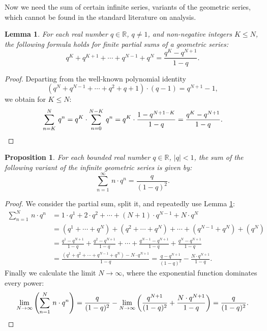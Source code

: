 \documentclass{amsart}
\newtheorem{lemma}{Lemma}[section]
\newtheorem{proposition}{Proposition}[section]
\theoremstyle{definition}
\theoremstyle{remark}
\begin{document}
\noindent
Now we need the sum of certain infinite series,
variants of the geometric series,
which cannot be found in the standard literature on analysis.
\begin{lemma}
\label{lem:FinitePart}
For each real number \(q\in\mathbb{R}\), \(q\ne 1\),
and non-negative integers \(K\le N\), the following formula holds
for finite partial sums of a geometric series:
\begin{equation}
\label{eqn:FinitePart}
q^K+q^{K+1}+\cdots+q^{N-1}+q^N=\frac{q^K-q^{N+1}}{1-q}.
\end{equation}
\end{lemma}
\begin{proof}
Departing from the well-known polynomial identity
\[\left(q^N+q^{N-1}+\cdots+q^2+q+1\right)\cdot(q-1)=q^{N+1}-1,\]
we obtain for \(K\le N\):
\[\sum_{n=K}^N\,q^n
=q^K\cdot\sum_{n=0}^{N-K}\,q^n
=q^K\cdot\frac{1-q^{N+1-K}}{1-q}
=\frac{q^K-q^{N+1}}{1-q}. \qedhere\]
\end{proof}
\begin{proposition}
\label{prp:GeometricVariant}
For each bounded real number \(q\in\mathbb{R}\), \(\lvert q\rvert<1\),
the sum of the following variant of the infinite geometric series is given by:
\begin{equation}
\label{eqn:GeometricVariant}
\sum_{n=1}^\infty\,n\cdot q^n=\frac{q}{(1-q)^2}.
\end{equation}
\end{proposition}
\begin{proof}
We consider the partial sum, split it, and repeatedly use Lemma
\ref{lem:FinitePart}:
\begin{equation*}
\label{eqn:Splitting}
\begin{aligned}
\sum_{n=1}^N\,n\cdot q^n
&=1\cdot q^1+2\cdot q^2+\cdots+(N+1)\cdot q^{N-1}+N\cdot q^N \\
&=(q^1+\cdots+q^N)+(q^2+\cdots+q^N)+\cdots+(q^{N-1}+q^N)+(q^N) \\
&=\frac{q^1-q^{N+1}}{1-q}+\frac{q^2-q^{N+1}}{1-q}+\cdots+\frac{q^{N-1}-q^{N+1}}{1-q}+\frac{q^{N}-q^{N+1}}{1-q} \\
&=\frac{(q^1+q^2+\cdots+q^{N-1}+q^N)-N\cdot q^{N+1}}{1-q}=\frac{q-q^{N+1}}{(1-q)^2}-\frac{N\cdot q^{N+1}}{1-q}.
\end{aligned}
\end{equation*}
Finally we calculate the limit \(N\to\infty\), where the exponential function dominates every power:
\[\lim_{N\to\infty}\left(\sum_{n=1}^N\,n\cdot q^n\right)
=\frac{q}{(1-q)^2}-\lim_{N\to\infty}\left(\frac{q^{N+1}}{(1-q)^2}+\frac{N\cdot q^{N+1}}{1-q}\right)
=\frac{q}{(1-q)^2}. \qedhere\]
\end{proof}
\end{document}
